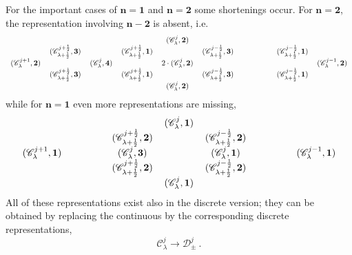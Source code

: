 \documentclass[12pt,a4paper]{article}
\newcommand{\be}{\begin{equation}}
\newcommand{\ee}{\end{equation}}
\begin{document}
For the important cases of $\mathbf{n}=\mathbf{1}$ and $\mathbf{n}=\mathbf{2}$ some shortenings occur. For $\mathbf{n}=\mathbf{2}$, the representation involving $\mathbf{n-2}$ is absent, i.e.\ 
\setlength{\tabcolsep}{-.5em}
\be 
\begin{tabular}{ccccccccc}
& & & & $(\mathscr{C}^{j}_\lambda,\mathbf{2})$ & & & & \\
& $(\mathscr{C}^{j+\frac{1}{2}}_{\lambda+\frac{1}{2}},\mathbf{3})$ & & $(\mathscr{C}^{j+\frac{1}{2}}_{\lambda+\frac{1}{2}},\mathbf{1})$ & & $(\mathscr{C}^{j-\frac{1}{2}}_{\lambda+\frac{1}{2}},\mathbf{3})$ & & $(\mathscr{C}^{j-\frac{1}{2}}_{\lambda+\frac{1}{2}},\mathbf{1})$ & \\
$(\mathscr{C}^{j+1}_{\lambda},\mathbf{2})$ & & $(\mathscr{C}^{j}_{\lambda},\mathbf{4})$& & $2 \cdot (\mathscr{C}^{j}_{\lambda},\mathbf{2})$& & \hspace*{1.2cm}& & $(\mathscr{C}^{j-1}_{\lambda},\mathbf{2})$ \\
& $(\mathscr{C}^{j+\frac{1}{2}}_{\lambda+\frac{1}{2}},\mathbf{3})$ & & $(\mathscr{C}^{j+\frac{1}{2}}_{\lambda+\frac{1}{2}},\mathbf{1})$ & & $(\mathscr{C}^{j-\frac{1}{2}}_{\lambda+\frac{1}{2}},\mathbf{3})$ & & $(\mathscr{C}^{j-\frac{1}{2}}_{\lambda+\frac{1}{2}},\mathbf{1})$ & \\
& & & & $(\mathscr{C}^{j}_\lambda,\mathbf{2})$ & & & & \label{eq:long representation n2}
\end{tabular} 
\ee
while for $\mathbf{n}=\mathbf{1}$ even more representations are missing,
\setlength{\tabcolsep}{-.2em}
\be 
\begin{tabular}{ccccccc}
& & & $(\mathscr{C}^{j}_\lambda,\mathbf{1})$ & & \\
 & & $(\mathscr{C}^{j+\frac{1}{2}}_{\lambda+\frac{1}{2}},\mathbf{2})$ & & $(\mathscr{C}^{j-\frac{1}{2}}_{\lambda+\frac{1}{2}},\mathbf{2})$ & & \\
$(\mathscr{C}^{j+1}_{\lambda},\mathbf{1})$ & \hspace*{1cm} & $(\mathscr{C}^{j}_{\lambda},\mathbf{3})$& & $(\mathscr{C}^{j}_{\lambda},\mathbf{1})$&\hspace*{1cm} & $(\mathscr{C}^{j-1}_{\lambda},\mathbf{1})$ \\
 & & $(\mathscr{C}^{j+\frac{1}{2}}_{\lambda+\frac{1}{2}},\mathbf{2})$ & & $(\mathscr{C}^{j-\frac{1}{2}}_{\lambda+\frac{1}{2}},\mathbf{2})$ & & \\
 & & & $(\mathscr{C}^{j}_\lambda,\mathbf{1})$ & & \label{eq:long representation n1}
\end{tabular} 
\ee
All of these representations exist also in the discrete version; they can be obtained by replacing the continuous by the corresponding discrete representations, 
\be 
\mathscr{C}^j_\lambda \longrightarrow \mathscr{D}^j_\pm\ .
\ee
\endgroup
\end{document}
